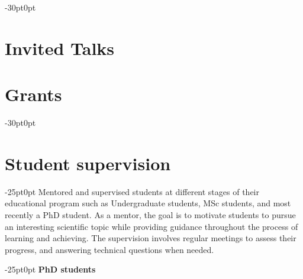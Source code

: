 \documentclass[line]{res}
\newenvironment{p1}
{\begin{adjustwidth}{-30pt}{0pt}
\vspace{8pt}}
{\end{adjustwidth}}
\newenvironment{p11}
{\begin{adjustwidth}{-25pt}{0pt}
\vspace{8pt}}
{\end{adjustwidth}}
\begin{document}
\begin{resume}
\begin{p1}
\section{Invited Talks}
\begin{etaremune}
    \item {}
    \item {}
    \item {}
    \item {}
    \item {}
    \item {}
    \item {}
    \item {}
    \item {}
    \item {}
    \item {}
\end{etaremune}
\end{p1}

\section{Grants}
\begin{p1}
\begin{etaremune}
    \item {}
\end{etaremune}
\end{p1}

\section{Student supervision}\vspace{0.5cm}
\begin{p11}
Mentored and supervised students at different stages of their educational program such as Undergraduate students, MSc students, and most recently a PhD student.
As a mentor, the goal is to motivate students to pursue an interesting scientific topic while providing guidance throughout the process of learning and achieving.
The supervision involves regular meetings to assess their progress, and answering technical questions when needed. \\
\end{p11}

\vspace{-15pt}
\begin{p11}
\textbf{PhD students}


\end{p11}
\end{resume}
\end{document}
